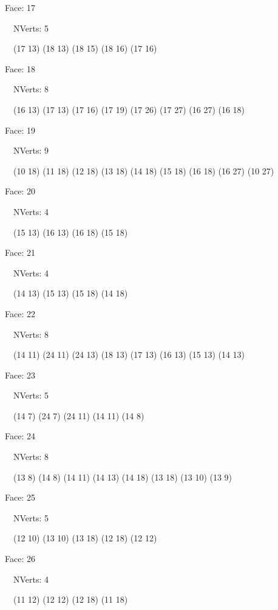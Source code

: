 \documentclass{article}
\begin{document}
{\footnotesize 

Face: 17

\   \    NVerts: 5

 \   \   (17 13) (18 13) (18 15) (18 16) (17 16)}

{\footnotesize 

Face: 18

\   \    NVerts: 8

 \   \   (16 13) (17 13) (17 16) (17 19) (17 26) (17 27) (16 27) (16 18)}

{\footnotesize 

Face: 19

\   \    NVerts: 9

 \   \   (10 18) (11 18) (12 18) (13 18) (14 18) (15 18) (16 18) (16 27) (10 27)}

{\footnotesize 

Face: 20

\   \    NVerts: 4

 \   \   (15 13) (16 13) (16 18) (15 18)}

{\footnotesize 

Face: 21

\   \    NVerts: 4

 \   \   (14 13) (15 13) (15 18) (14 18)}

{\footnotesize 

Face: 22

\   \    NVerts: 8

 \   \   (14 11) (24 11) (24 13) (18 13) (17 13) (16 13) (15 13) (14 13)}

{\footnotesize 

Face: 23

\   \    NVerts: 5

 \   \   (14 7) (24 7) (24 11) (14 11) (14 8)}

{\footnotesize 

Face: 24

\   \    NVerts: 8

 \   \   (13 8) (14 8) (14 11) (14 13) (14 18) (13 18) (13 10) (13 9)}

{\footnotesize 

Face: 25

\   \    NVerts: 5

 \   \   (12 10) (13 10) (13 18) (12 18) (12 12)}

{\footnotesize 

Face: 26

\   \    NVerts: 4

 \   \   (11 12) (12 12) (12 18) (11 18)}
\end{document}
